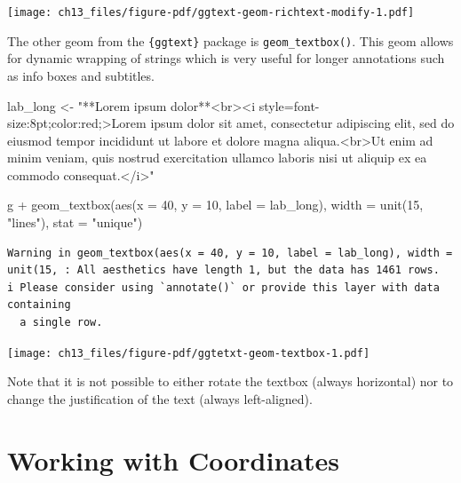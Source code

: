 \documentclass[
  letterpaper,
]{scrbook}
\newenvironment{Shaded}{\begin{snugshade}}{\end{snugshade}}
\newcommand{\AttributeTok}[1]{\textcolor[rgb]{0.40,0.45,0.13}{#1}}
\newcommand{\DecValTok}[1]{\textcolor[rgb]{0.68,0.00,0.00}{#1}}
\newcommand{\FunctionTok}[1]{\textcolor[rgb]{0.28,0.35,0.67}{#1}}
\newcommand{\NormalTok}[1]{\textcolor[rgb]{0.00,0.23,0.31}{#1}}
\newcommand{\OtherTok}[1]{\textcolor[rgb]{0.00,0.23,0.31}{#1}}
\newcommand{\SpecialCharTok}[1]{\textcolor[rgb]{0.37,0.37,0.37}{#1}}
\newcommand{\StringTok}[1]{\textcolor[rgb]{0.13,0.47,0.30}{#1}}
\begin{document}
\texttt{[image: ch13\_files/figure-pdf/ggtext-geom-richtext-modify-1.pdf]}

The other geom from the \texttt{\{ggtext\}} package is
\texttt{geom\_textbox()}. This geom allows for dynamic wrapping of
strings which is very useful for longer annotations such as info boxes
and subtitles.

\begin{Shaded}
\begin{Highlighting}[]
\NormalTok{lab\_long }\OtherTok{\textless{}{-}} \StringTok{"**Lorem ipsum dolor**\textless{}br\textgreater{}\textless{}i style=\textquotesingle{}font{-}size:8pt;color:red;\textquotesingle{}\textgreater{}Lorem ipsum dolor sit amet, consectetur adipiscing elit, sed do eiusmod tempor incididunt ut labore et dolore magna aliqua.\textless{}br\textgreater{}Ut enim ad minim veniam, quis nostrud exercitation ullamco laboris nisi ut aliquip ex ea commodo consequat.\textless{}/i\textgreater{}"}

\NormalTok{g }\SpecialCharTok{+}
  \FunctionTok{geom\_textbox}\NormalTok{(}\FunctionTok{aes}\NormalTok{(}\AttributeTok{x =} \DecValTok{40}\NormalTok{, }\AttributeTok{y =} \DecValTok{10}\NormalTok{, }\AttributeTok{label =}\NormalTok{ lab\_long),}
               \AttributeTok{width =} \FunctionTok{unit}\NormalTok{(}\DecValTok{15}\NormalTok{, }\StringTok{"lines"}\NormalTok{), }\AttributeTok{stat =} \StringTok{"unique"}\NormalTok{)}
\end{Highlighting}
\end{Shaded}

\begin{verbatim}
Warning in geom_textbox(aes(x = 40, y = 10, label = lab_long), width = unit(15, : All aesthetics have length 1, but the data has 1461 rows.
i Please consider using `annotate()` or provide this layer with data containing
  a single row.
\end{verbatim}

\texttt{[image: ch13\_files/figure-pdf/ggtetxt-geom-textbox-1.pdf]}

Note that it is not possible to either rotate the textbox (always
horizontal) nor to change the justification of the text (always
left-aligned).


\chapter{Working with Coordinates}\label{coords}
\end{document}
